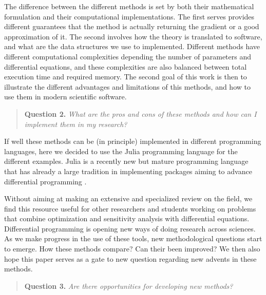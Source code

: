 The difference between the different methods is set by both their mathematical formulation and their computational implementations. 
The first serves provides different guarantees that the method is actually returning the gradient or a good approximation of it. 
The second involves how the theory is translated to software, and what are the data structures we use to implemented. 
Different methods have different computational complexities depending the number of parameters and differential equations, and these complexities are also balanced between total execution time and required memory. 
The second goal of this work is then to illustrate the different advantages and limitations of this methods, and how to use them in modern scientific software. 
\begin{quote}
    \textbf{Question 2. }
    \textit{What are the pros and cons of these methods and how can I implement them in my research?}
\end{quote}
If well these methods can be (in principle) implemented in different programming languages, here we decided to use the Julia programming language for the different examples. 
Julia is a recently new but mature programming language that has already a large tradition in implementing packages aiming to advance differential programming \cite{Julialang_2017}. 

Without aiming at making an extensive and specialized review on the field, we find this resource useful for other researchers and students working on problems that combine optimization and sensitivity analysis with differential equations.
Differential programming is opening new ways of doing research across sciences. 
As we make progress in the use of these tools, new methodological questions start to emerge. 
How these methods compare? Can their been improved? 
We then also hope this paper serves as a gate to new question regarding new advents in these methods. 
\begin{quote}
    \textbf{Question 3. }
    \textit{Are there opportunities for developing new methods?}
\end{quote}


